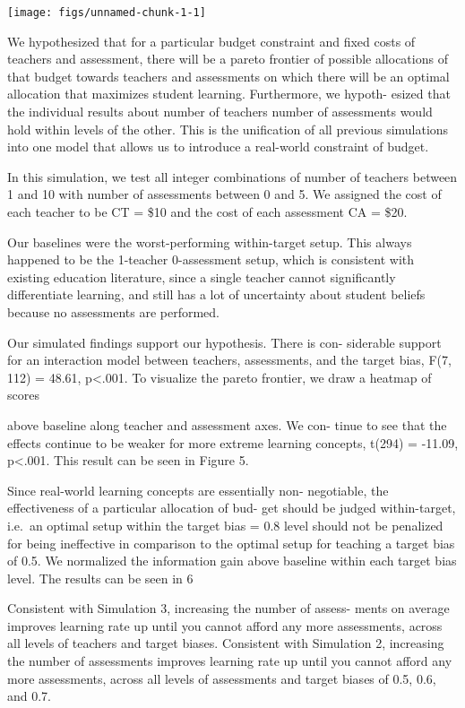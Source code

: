 \documentclass[10pt, letterpaper]{article}
\newenvironment{CodeChunk}{}{}
\begin{document}
\begin{CodeChunk}

\texttt{[image: figs/unnamed-chunk-1-1]} \end{CodeChunk}

We hypothesized that for a particular budget constraint and fixed costs
of teachers and assessment, there will be a pareto frontier of possible
allocations of that budget towards teachers and assessments on which
there will be an optimal allocation that maximizes student learning.
Furthermore, we hypoth- esized that the individual results about number
of teachers number of assessments would hold within levels of the other.
This is the unification of all previous simulations into one model that
allows us to introduce a real-world constraint of budget.

In this simulation, we test all integer combinations of number of
teachers between 1 and 10 with number of assessments between 0 and 5. We
assigned the cost of each teacher to be CT = \$10 and the cost of each
assessment CA = \$20.

Our baselines were the worst-performing within-target setup. This always
happened to be the 1-teacher 0-assessment setup, which is consistent
with existing education literature, since a single teacher cannot
significantly differentiate learning, and still has a lot of uncertainty
about student beliefs because no assessments are performed.

Our simulated findings support our hypothesis. There is con- siderable
support for an interaction model between teachers, assessments, and the
target bias, F(7, 112) = 48.61, p\textless{}.001. To visualize the
pareto frontier, we draw a heatmap of scores

above baseline along teacher and assessment axes. We con- tinue to see
that the effects continue to be weaker for more extreme learning
concepts, t(294) = -11.09, p\textless{}.001. This result can be seen in
Figure 5.

Since real-world learning concepts are essentially non- negotiable, the
effectiveness of a particular allocation of bud- get should be judged
within-target, i.e.~an optimal setup within the target bias = 0.8 level
should not be penalized for being ineffective in comparison to the
optimal setup for teaching a target bias of 0.5. We normalized the
information gain above baseline within each target bias level. The
results can be seen in 6

Consistent with Simulation 3, increasing the number of assess- ments on
average improves learning rate up until you cannot afford any more
assessments, across all levels of teachers and target biases. Consistent
with Simulation 2, increasing the number of assessments improves
learning rate up until you cannot afford any more assessments, across
all levels of assessments and target biases of 0.5, 0.6, and 0.7.
\end{document}
